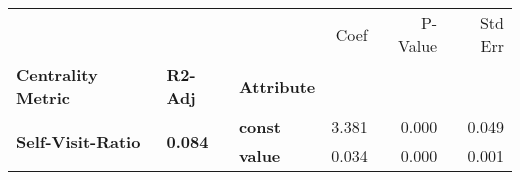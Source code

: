 \begin{tabular}{lllrrr}
\toprule
                 &       &       &  Coef &  P-Value &  Std Err \\
\textbf{Centrality Metric} & \textbf{R2-Adj} & \textbf{Attribute} &       &          &          \\
\midrule
\multirow{2}{*}{\textbf{Self-Visit-Ratio}} & \multirow{2}{*}{\textbf{0.084}} & \textbf{const} & 3.381 &    0.000 &    0.049 \\
                 &       & \textbf{value} & 0.034 &    0.000 &    0.001 \\
\bottomrule
\end{tabular}
